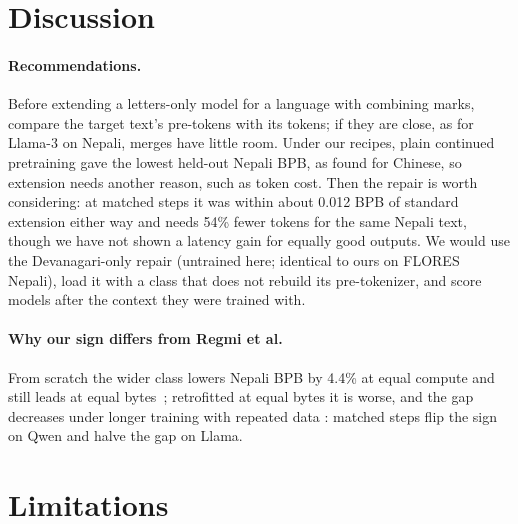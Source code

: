 \section{Discussion}
\label{sec:discussion}

\paragraph{Recommendations.} Before extending a letters-only model for a language with combining marks, compare the target text's pre-tokens with its tokens; if they are close, as for Llama-3 on Nepali, merges have little room. Under our recipes, plain continued pretraining gave the lowest held-out Nepali BPB, as \citet{zhao2024llamabeyond} found for Chinese, so extension needs another reason, such as token cost. Then the repair is worth considering: at matched steps it was within about 0.012 BPB of standard extension either way and needs 54\% fewer tokens for the same Nepali text, though we have not shown a latency gain for equally good outputs. We would use the Devanagari-only repair (untrained here; identical to ours on FLORES Nepali), load it with a class that does not rebuild its pre-tokenizer, and score models after the context they were trained with.

\paragraph{Why our sign differs from Regmi et al.} From scratch the wider class lowers Nepali BPB by 4.4\% at equal compute and still leads at equal bytes~\citep{regmi2026vowel}; retrofitted at equal bytes it is worse, and the gap decreases under longer training with repeated data \citep[cf.][]{shrestha2026papaya}: matched steps flip the sign on Qwen and halve the gap on Llama.

\section*{Limitations}

